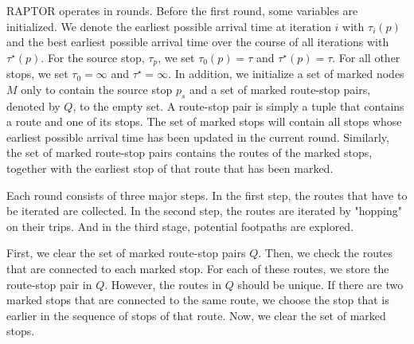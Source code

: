 RAPTOR operates in rounds.
Before the first round, some variables are initialized.
We denote the earliest possible arrival time at iteration \(i\) with \(\tau_i(p)\) and the best earliest possible arrival time over the course of all iterations with \(\tau^\star(p)\).
For the source stop, \(\tau_p\), we set \(\tau_0(p) =\tau\) and \(\tau^\star(p) = \tau\).
For all other stops, we set \(\tau_0 = \infty\) and \(\tau^\star = \infty\).
In addition, we initialize a set of marked nodes \(M\) only to contain the source stop \(p_s\) and a set of marked route-stop pairs, denoted by \(Q\), to the empty set.
A route-stop pair is simply a tuple that contains a route and one of its stops.
The set of marked stops will contain all stops whose earliest possible arrival time has been updated in the current round.
Similarly, the set of marked route-stop pairs contains the routes of the marked stops, together with the earliest stop of that route that has been marked.


Each round consists of three major steps.
In the first step, the routes that have to be iterated are collected.
In the second step, the routes are iterated by "hopping" on their trips.
And in the third stage, potential footpaths are explored.

First, we clear the set of marked route-stop pairs \(Q\).
Then, we check the routes that are connected to each marked stop.
For each of these routes, we store the route-stop pair in \(Q\).
However, the routes in \(Q\) should be unique.
If there are two marked stops that are connected to the same route, we choose the stop that is earlier in the sequence of stops of that route.
Now, we clear the set of marked stops.

